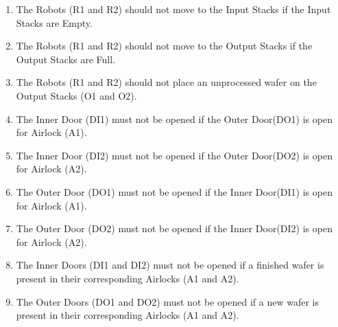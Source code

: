 \documentclass[a4paper,12pt]{article}
\begin{document}
\begin{enumerate}

\item The Robots (R1 and R2) should not move to the Input Stacks if the Input Stacks are Empty.

\item The Robots (R1 and R2) should not move to the Output Stacks if the Output Stacks are Full.


\item The Robots (R1 and R2) should not place an unprocessed wafer on the Output Stacks (O1 and O2).




\item The Inner Door (DI1) must not be opened if the Outer Door(DO1) is open for Airlock (A1).

\item The Inner Door (DI2) must not be opened if the Outer Door(DO2) is open for Airlock (A2).

\item The Outer Door (DO1) must not be opened if the Inner Door(DI1) is open for Airlock (A1).

\item The Outer Door (DO2) must not be opened if the Inner Door(DI2) is open for Airlock (A2).

\item The Inner Doors (DI1 and DI2) must not be opened if a finished wafer is present in their corresponding Airlocks (A1 and A2).

\item The Outer Doors (DO1 and DO2) must not be opened if a new wafer is present in their corresponding Airlocks (A1 and A2).


\end{enumerate}
\end{document}
